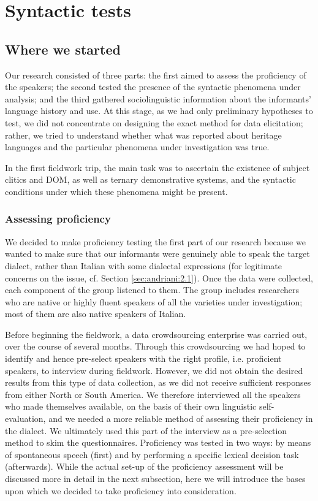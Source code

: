 \documentclass[output=paper,hidelinks]{langscibook}
\begin{document}
\section{Syntactic tests}\label{sec:andriani:3}

\subsection{Where we started}\label{sec:andriani:3.1}

Our research consisted of three parts: the first aimed to assess the proficiency of the speakers; the second tested the presence of the syntactic phenomena under analysis; and the third gathered sociolinguistic information about the informants’ language history and use. At this stage, as we had only preliminary hypotheses to test, we did not concentrate on designing the exact method for data elicitation; rather, we tried to understand whether what was reported about heritage languages and the particular phenomena under investigation was true.

In the first fieldwork trip, the main task was to ascertain the existence of subject clitics and DOM, as well as ternary demonstrative systems, and the syntactic conditions under which these phenomena might be present.

\subsubsection{Assessing proficiency}\label{sec:andriani:3.1.1}

We decided to make proficiency testing the first part of our research because we wanted to make sure that our informants were genuinely able to speak the target dialect, rather than Italian with some dialectal expressions (for legitimate concerns on the issue, cf. Section \ref{sec:andriani:2.1}). Once the data were collected, each component of the group listened to them. The group includes researchers who are native or highly fluent speakers of all the varieties under investigation; most of them are also native speakers of Italian.

Before beginning the fieldwork, a data crowdsourcing enterprise was carried out, over the course of several months. Through this crowdsourcing we had hoped to identify and hence pre-select speakers with the right profile, i.e. proficient speakers, to interview during fieldwork. However, we did not obtain the desired results from this type of data collection, as we did not receive sufficient responses from either North or South America. We therefore interviewed all the speakers who made themselves available, on the basis of their own linguistic self-evaluation, and we needed a more reliable method of assessing their proficiency in the dialect. We ultimately used this part of the interview as a pre-selection method to skim the questionnaires. Proficiency was tested in two ways: by means of spontaneous speech (first) and by performing a specific lexical decision task (afterwards). While the actual set-up of the proficiency assessment will be discussed more in detail in the next subsection, here we will introduce the bases upon which we decided to take proficiency into consideration. 
\end{document}
